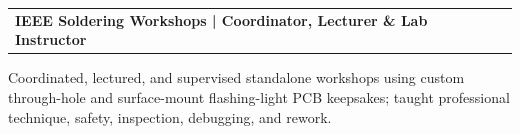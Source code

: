 \documentclass[10pt,letterpaper]{article}
\makeatletter
\newcommand{\resumeentry}[2]{%
  \begin{tabularx}{\textwidth}{@{}X>{\raggedleft\arraybackslash}p{2.40in}@{}}
    \textbf{#1} & #2
  \end{tabularx}\vspace{-0.075cm}
}
\makeatother
\begin{document}
\resumeentry{IEEE Soldering Workshops | Coordinator, Lecturer \& Lab Instructor}{}
\begin{resumebullets}
  \item Coordinated, lectured, and supervised standalone workshops using custom through-hole and surface-mount flashing-light PCB keepsakes; taught professional technique, safety, inspection, debugging, and rework.
\end{resumebullets}
\end{document}
